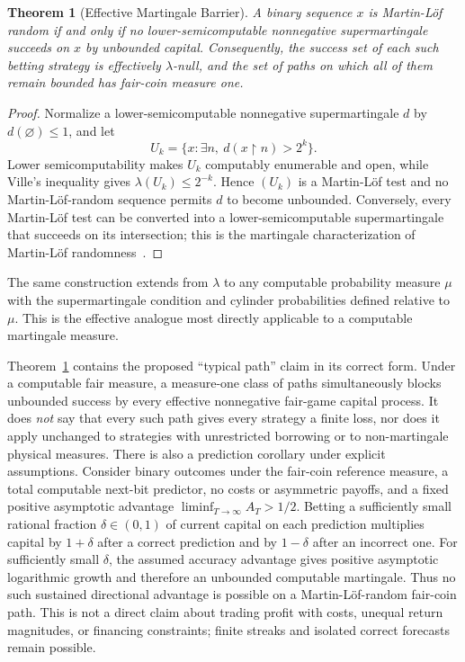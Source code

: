 \documentclass[aps,pra,reprint,superscriptaddress,amsmath,amssymb,floatfix]{revtex4-2}
\theoremstyle{plain}
\newtheorem{theorem}{Theorem}
\theoremstyle{definition}
\theoremstyle{remark}
\begin{document}
\begin{theorem}[Effective Martingale Barrier]
  \label{thm:effective}
  A binary sequence \(x\) is Martin-L\"of random if and only if no
  lower-semicomputable nonnegative supermartingale succeeds on \(x\) by
  unbounded capital. Consequently, the success set of each such betting
  strategy is effectively \(\lambda\)-null, and the set of paths on which all
  of them remain bounded has fair-coin measure one.
\end{theorem}

\begin{proof}
Normalize a lower-semicomputable nonnegative supermartingale \(d\) by
\(d(\varnothing)\leq1\), and let
\[
  U_k=\{x:\exists n,\ d(x{\upharpoonright}n)>2^k\}.
\]
Lower semicomputability makes \(U_k\) computably enumerable and open, while
Ville's inequality gives \(\lambda(U_k)\leq2^{-k}\). Hence
\((U_k)\) is a Martin-L\"of test and no Martin-L\"of-random sequence permits
\(d\) to become unbounded. Conversely, every Martin-L\"of test can be converted
into a lower-semicomputable supermartingale that succeeds on its intersection;
this is the martingale characterization of Martin-L\"of
randomness~\cite{calude:02,Nies2009}.
\end{proof}

The same construction extends from \(\lambda\) to any computable probability
measure \(\mu\) with the supermartingale condition and cylinder probabilities
defined relative to \(\mu\). This is the effective analogue most directly
applicable to a computable martingale measure.

Theorem~\ref{thm:effective} contains the proposed ``typical path'' claim in its
correct form. Under a computable fair measure, a measure-one class of paths
simultaneously blocks unbounded success by every effective nonnegative
fair-game capital process. It does \emph{not} say that every such path gives
every strategy a finite loss, nor does it apply unchanged to strategies with
unrestricted borrowing or to non-martingale physical measures.
There is also a prediction corollary under explicit assumptions. Consider
binary outcomes under the fair-coin reference measure, a total computable
next-bit predictor, no costs or asymmetric payoffs, and a fixed positive
asymptotic advantage \(\liminf_{T\to\infty}A_T>1/2\). Betting a sufficiently
small rational fraction \(\delta\in(0,1)\) of current capital on each
prediction multiplies capital by \(1+\delta\) after a correct prediction and
by \(1-\delta\) after an incorrect one. For sufficiently small \(\delta\), the
assumed accuracy advantage gives positive asymptotic logarithmic growth and
therefore an unbounded computable martingale. Thus no such sustained
directional advantage is possible on a Martin-L\"of-random fair-coin path.
This is not a direct claim about trading profit with costs, unequal return
magnitudes, or financing constraints; finite streaks and isolated correct
forecasts remain possible.
\end{document}
